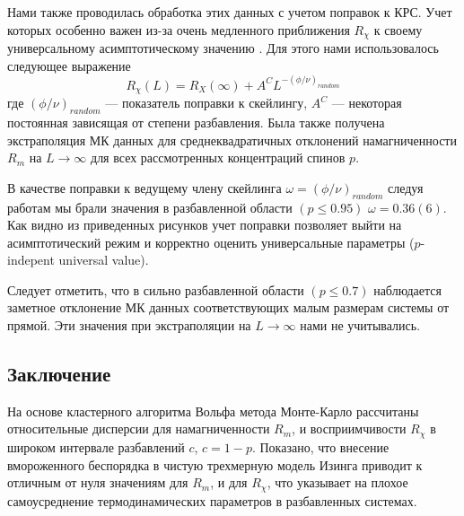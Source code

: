 Нами также проводилась обработка этих данных с учетом поправок к КРС. Учет которых особенно важен из-за очень медленного приближения $R_\chi$ к своему универсальному асимптотическому значению \cite{ph2_3}. Для этого нами использовалось следующее выражение
\begin{equation}
  R_\chi(L) = R_X(\infty)+A^C L^{-(\phi/\nu)_{random}}
\end{equation}
где $(\phi/\nu)_{random}$ --- показатель поправки к скейлингу, $A^C$ --- некоторая постоянная зависящая от степени разбавления.
Была также получена экстраполяция МК данных для среднеквадратичных отклонений намагниченности $R_m$ на $L \rightarrow \infty$  для всех рассмотренных концентраций спинов $p$.

В качестве поправки к ведущему члену скейлинга $\omega = (\phi/\nu)_{random}$  следуя работам \cite{ph2_8,ph2_9} мы брали значения в разбавленной области $(p\le0.95)$ $\omega=0.36(6)$.
Как видно из приведенных рисунков учет поправки позволяет выйти на асимптотический режим и корректно оценить универсальные параметры ($p$-indepent universal value).

Следует отметить, что в сильно разбавленной области $(p\le0.7)$ наблюдается заметное отклонение МК данных соответствующих малым размерам системы от прямой. Эти значения при экстраполяции на $L \rightarrow \infty$    нами не учитывались.






\subsection{Заключение}


На основе кластерного алгоритма Вольфа метода Монте-Карло рассчитаны относительные дисперсии для намагниченности $R_m$, и восприимчивости $R_\chi$ в широком интервале разбавлений $c$, $c=1-p$.
Показано, что внесение вмороженного беспорядка в чистую трехмерную модель Изинга приводит к отличным от нуля значениям для $R_m$, и для $R_\chi$, что указывает на плохое самоусреднение термодинамических параметров в разбавленных системах.


